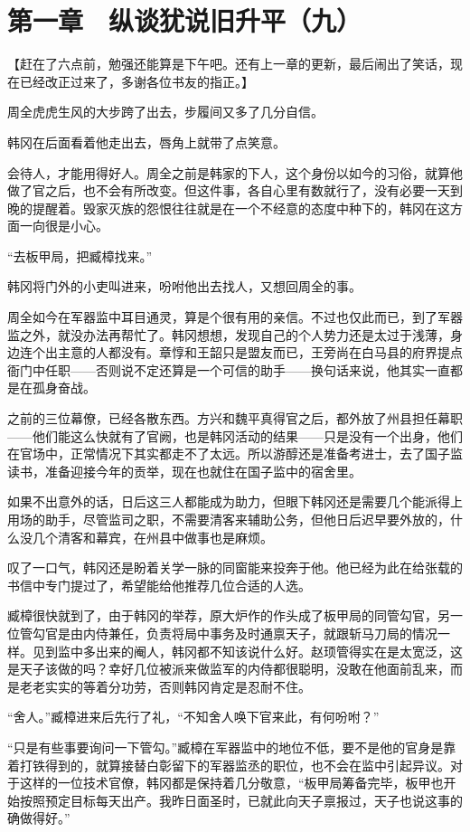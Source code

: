 \section{第一章　纵谈犹说旧升平（九）}

【赶在了六点前，勉强还能算是下午吧。还有上一章的更新，最后闹出了笑话，现在已经改正过来了，多谢各位书友的指正。】

周全虎虎生风的大步跨了出去，步履间又多了几分自信。

韩冈在后面看着他走出去，唇角上就带了点笑意。

会待人，才能用得好人。周全之前是韩家的下人，这个身份以如今的习俗，就算他做了官之后，也不会有所改变。但这件事，各自心里有数就行了，没有必要一天到晚的提醒着。毁家灭族的怨恨往往就是在一个不经意的态度中种下的，韩冈在这方面一向很是小心。

“去板甲局，把臧樟找来。”

韩冈将门外的小吏叫进来，吩咐他出去找人，又想回周全的事。

周全如今在军器监中耳目通灵，算是个很有用的亲信。不过也仅此而已，到了军器监之外，就没办法再帮忙了。韩冈想想，发现自己的个人势力还是太过于浅薄，身边连个出主意的人都没有。章惇和王韶只是盟友而已，王旁尚在白马县的府界提点衙门中任职——否则说不定还算是一个可信的助手——换句话来说，他其实一直都是在孤身奋战。

之前的三位幕僚，已经各散东西。方兴和魏平真得官之后，都外放了州县担任幕职——他们能这么快就有了官阙，也是韩冈活动的结果——只是没有一个出身，他们在官场中，正常情况下其实都走不了太远。所以游醇还是准备考进士，去了国子监读书，准备迎接今年的贡举，现在也就住在国子监中的宿舍里。

如果不出意外的话，日后这三人都能成为助力，但眼下韩冈还是需要几个能派得上用场的助手，尽管监司之职，不需要清客来辅助公务，但他日后迟早要外放的，什么没几个清客和幕宾，在州县中做事也是麻烦。

叹了一口气，韩冈还是盼着关学一脉的同窗能来投奔于他。他已经为此在给张载的书信中专门提过了，希望能给他推荐几位合适的人选。

臧樟很快就到了，由于韩冈的举荐，原大炉作的作头成了板甲局的同管勾官，另一位管勾官是由内侍兼任，负责将局中事务及时通禀天子，就跟斩马刀局的情况一样。见到监中多出来的阉人，韩冈都不知该说什么好。赵顼管得实在是太宽泛，这是天子该做的吗？幸好几位被派来做监军的内侍都很聪明，没敢在他面前乱来，而是老老实实的等着分功劳，否则韩冈肯定是忍耐不住。

“舍人。”臧樟进来后先行了礼，“不知舍人唤下官来此，有何吩咐？”

“只是有些事要询问一下管勾。”臧樟在军器监中的地位不低，要不是他的官身是靠着打铁得到的，就算接替白彰留下的军器监丞的职位，也不会在监中引起异议。对于这样的一位技术官僚，韩冈都是保持着几分敬意，“板甲局筹备完毕，板甲也开始按照预定目标每天出产。我昨日面圣时，已就此向天子禀报过，天子也说这事的确做得好。”

